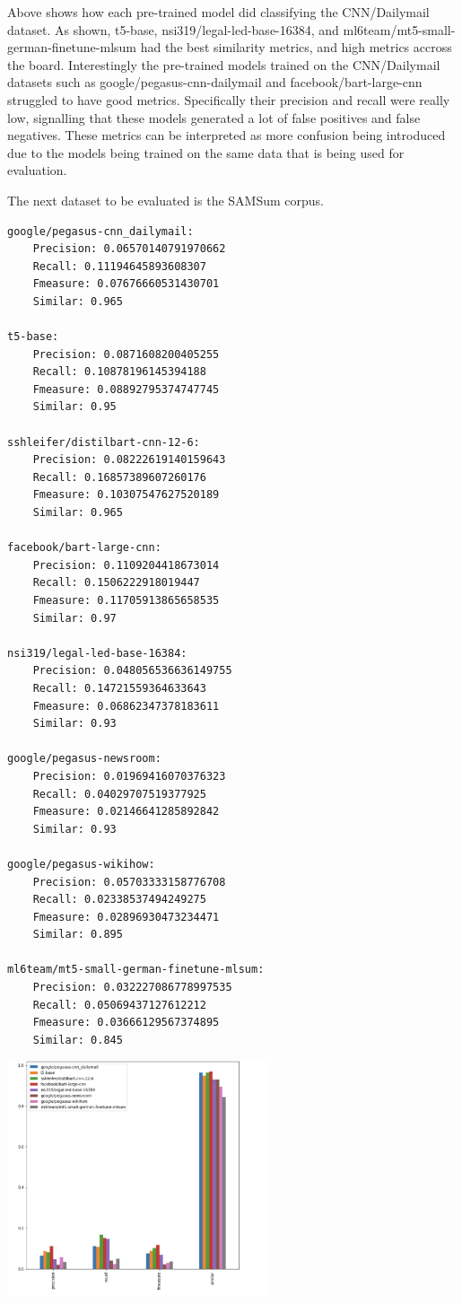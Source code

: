 \documentclass[twoside,twocolumn]{article}
\begin{document}
Above shows how each pre-trained model did classifying the CNN/Dailymail dataset. As shown, t5-base, nsi319/legal-led-base-16384, and ml6team/mt5-small-german-finetune-mlsum had the best similarity metrics, and high metrics accross the board. Interestingly the pre-trained models trained on the CNN/Dailymail datasets such as google/pegasus-cnn-dailymail and facebook/bart-large-cnn struggled to have good metrics. Specifically their precision and recall were really low, signalling that these models generated a lot of false positives and false negatives. These metrics can be interpreted as more confusion being introduced due to the models being trained on the same data that is being used for evaluation.

The next dataset to be evaluated is the SAMSum corpus.
\begin{verbatim}
google/pegasus-cnn_dailymail:
	Precision: 0.06570140791970662
	Recall: 0.11194645893608307
	Fmeasure: 0.07676660531430701
	Similar: 0.965
	
t5-base:
	Precision: 0.0871608200405255
	Recall: 0.10878196145394188
	Fmeasure: 0.08892795374747745
	Similar: 0.95
	
sshleifer/distilbart-cnn-12-6:
	Precision: 0.08222619140159643
	Recall: 0.16857389607260176
	Fmeasure: 0.10307547627520189
	Similar: 0.965
	
facebook/bart-large-cnn:
	Precision: 0.1109204418673014
	Recall: 0.1506222918019447
	Fmeasure: 0.11705913865658535
	Similar: 0.97
	
nsi319/legal-led-base-16384:
	Precision: 0.048056536636149755
	Recall: 0.14721559364633643
	Fmeasure: 0.06862347378183611
	Similar: 0.93
	
google/pegasus-newsroom:
	Precision: 0.01969416070376323
	Recall: 0.04029707519377925
	Fmeasure: 0.02146641285892842
	Similar: 0.93
	
google/pegasus-wikihow:
	Precision: 0.05703333158776708
	Recall: 0.02338537494249275
	Fmeasure: 0.02896930473234471
	Similar: 0.895
	
ml6team/mt5-small-german-finetune-mlsum:
	Precision: 0.032227086778997535
	Recall: 0.05069437127612212
	Fmeasure: 0.03666129567374895
	Similar: 0.845
\end{verbatim}
\includegraphics[width=0.58\textwidth,height=0.8\textheight,keepaspectratio]{report/graph-sam.png}
\end{document}
